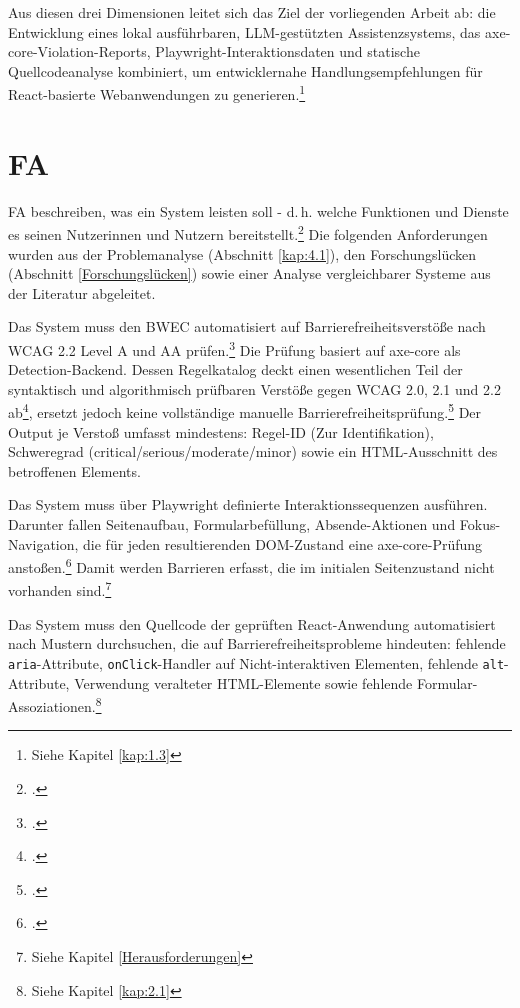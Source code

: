 Aus diesen drei Dimensionen leitet sich das Ziel der vorliegenden Arbeit ab: die Entwicklung eines lokal ausführbaren, \ac{LLM}-gestützten Assistenzsystems, das axe-core-Violation-Reports, Playwright-Interaktionsdaten und statische Quellcodeanalyse kombiniert, um entwicklernahe Handlungsempfehlungen für React-basierte Webanwendungen zu generieren.\footnote{Siehe Kapitel \ref{kap:1.3}}

\section{\acf{FA}} \label{kap:4.2}

\acf{FA} beschreiben, was ein System leisten soll - d.\,h. welche Funktionen und Dienste es seinen Nutzerinnen und Nutzern bereitstellt.\footcite[Vgl.][S. 6-9]{sommerville2016software}  Die folgenden Anforderungen wurden aus der Problemanalyse (Abschnitt \ref{kap:4.1}), den Forschungslücken (Abschnitt \ref{Forschungslücken}) sowie einer Analyse vergleichbarer Systeme aus der Literatur abgeleitet.


Das System muss den BWEC automatisiert auf Barrierefreiheitsverstöße nach \ac{WCAG} 2.2 Level A und AA prüfen.\footcite[Vgl.][]{bwec,WCAG} Die Prüfung basiert auf axe-core als Detection-Backend. Dessen Regelkatalog deckt einen wesentlichen Teil der syntaktisch und algorithmisch prüfbaren Verstöße gegen \ac{WCAG} 2.0, 2.1 und 2.2 ab\footcite[Vgl.][]{WCAG}, ersetzt jedoch keine vollständige manuelle Barrierefreiheitsprüfung.\footcite[Vgl.][]{axe} Der Output je Verstoß umfasst mindestens: Regel-ID (Zur Identifikation), Schweregrad (critical/serious/moderate/minor) sowie ein \ac{HTML}-Ausschnitt des betroffenen Elements. %


Das System muss über Playwright definierte Interaktionssequenzen ausführen. Darunter fallen Seitenaufbau, Formularbefüllung, Absende-Aktionen und Fokus-Navigation, die für jeden resultierenden \ac{DOM}-Zustand eine axe-core-Prüfung anstoßen.\footcite[Vgl.][]{playwright} Damit werden Barrieren erfasst, die im initialen Seitenzustand nicht vorhanden sind.\footnote{Siehe Kapitel \ref{Herausforderungen}}


Das System muss den Quellcode der geprüften React-Anwendung automatisiert nach Mustern durchsuchen, die auf Barrierefreiheitsprobleme hindeuten: fehlende \texttt{aria}-Attribute, \texttt{onClick}-Handler auf Nicht-interaktiven Elementen, fehlende \texttt{alt}-Attribute, Verwendung veralteter \ac{HTML}-Elemente sowie fehlende Formular-Assoziationen.\footnote{Siehe Kapitel \ref{kap:2.1}}

